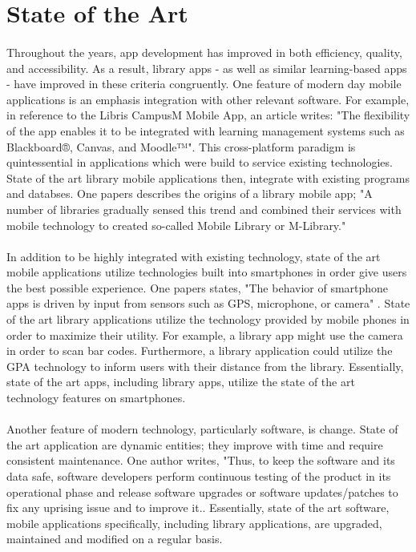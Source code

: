 \begin{itemize}
    \end{itemize}
    
    
\section{State of the Art}
    \paragraph{}
    Throughout the years, app development has improved in both efficiency, quality, and accessibility. As a result, library apps - as well as similar learning-based apps - have improved in these criteria congruently. One feature of modern day mobile applications is an emphasis integration with other relevant software. For example, in reference to the Libris CampusM Mobile App, an article writes: "The flexibility of the app enables it to be integrated with learning management systems such as Blackboard®, Canvas, and Moodle™"\cite{campusM}. This cross-platform paradigm is quintessential in applications which were build to service existing technologies. State of the art library mobile applications then, integrate with existing programs and databses. One papers describes the origins of a library mobile app; "A number of libraries gradually sensed this trend and combined their services with mobile technology to created so-called Mobile Library or M-Library." \cite{design_and_impl}
    \paragraph{}
    In addition to be highly integrated with existing technology, state of the art mobile applications utilize technologies built into smartphones in order give users the best possible experience. One papers states, "The behavior of smartphone apps is driven by input from sensors such as GPS, microphone, or camera"  \cite{}. State of the art library applications utilize the technology provided by mobile phones in order to maximize their utility. For example, a library app might use the camera in order to scan bar codes. Furthermore, a library application could utilize the GPA technology to inform users with their distance from the library. Essentially, state of the art apps, including library apps, utilize the state of the art technology features on smartphones.
    \paragraph{}
    Another feature of modern technology, particularly software, is change. State of the art application are dynamic entities; they improve with time and require consistent maintenance. One author writes, "Thus, to keep the software and its data safe, software developers perform continuous testing of the product in its operational phase and release software upgrades or software updates/patches to fix any uprising issue and to improve it.\cite{Reliability_modeling}.  Essentially, state of the art software, mobile applications specifically, including library applications, are upgraded, maintained and modified on a regular basis. 
    
